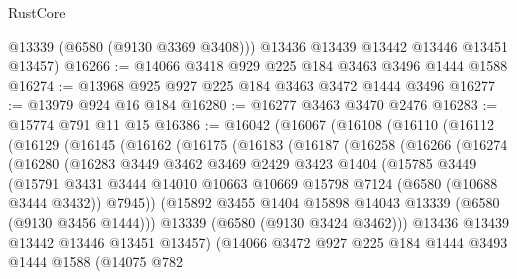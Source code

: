 \begin{lexlean}{RustCore}
\begin{coremodule}
        @13339
        (@6580 (@9130 @3369 @3408)))
      @13436
      @13439
      @13442
      @13446
      @13451
      @13457)
@16266 := @14066 @3418 @929 @225 @184 @3463 @3496 @1444 @1588
@16274 := @13968 @925 @927 @225 @184 @3463 @3472 @1444 @3496
@16277 := @13979 @924 @16 @184
@16280 := @16277 @3463 @3470 @2476
@16283 := @15774 @791 @11 @15
@16386 := @16042
    (@16067
      (@16108
        (@16110
          (@16112
            (@16129
              (@16145
                (@16162
                  (@16175
                    (@16183
                      (@16187
                        (@16258
                          (@16266
                            (@16274
                              (@16280
                                (@16283
                                  @3449
                                  @3462
                                  @3469
                                  @2429
                                  @3423
                                  @1404
                                  (@15785
                                    @3449
                                    (@15791
                                      @3431
                                      @3444
                                      @14010
                                      @10663
                                      @10669
                                      @15798
                                      @7124
                                      (@6580 (@10688 @3444 @3432))
                                      @7945))
                                  (@15892
                                    @3455
                                    @1404
                                    @15898
                                    @14043
                                    @13339
                                    (@6580 (@9130 @3456 @1444)))
                                  @13339
                                  (@6580 (@9130 @3424 @3462)))
                                @13436
                                @13439
                                @13442
                                @13446
                                @13451
                                @13457)
                              (@14066
                                @3472
                                @927
                                @225
                                @184
                                @1444
                                @3493
                                @1444
                                @1588
                                (@14075
                                  @782

\end{coremodule}
\end{lexlean}
